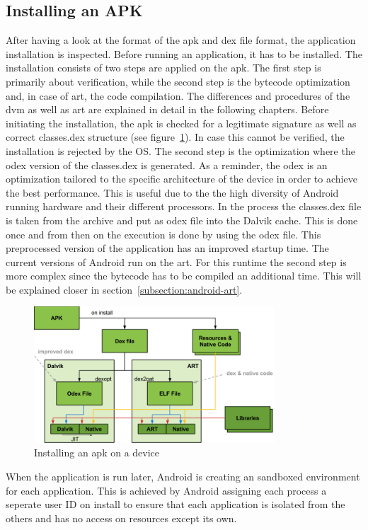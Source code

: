 \subsection{Installing an APK} \label{subsection:android-install}
After having a look at the format of the \gls{apk} and \gls{dex} file format, the application installation is inspected.
Before running an application, it has to be installed.
The installation consists of two steps are applied on the \gls{apk}.
The first step is primarily about verification, while the second step is the bytecode optimization and, in case of \gls{art}, the code compilation.
The differences and procedures of the \gls{dvm} as well as \gls{art} are explained in detail in the following chapters.
Before initiating the installation, the \gls{apk} is checked for a legitimate signature as well as correct classes.dex structure (see figure~\ref{fig:install}).
In case this cannot be verified, the installation is rejected by the OS.
The second step is the optimization where the \gls{odex} version of the classes.dex is generated.
As a reminder, the \gls{odex} is an optimization tailored to the specific architecture of the device in order to achieve the best performance.
This is useful due to the the high diversity of Android running hardware and their different processors.
In the process the classes.dex file is taken from the archive and put as \gls{odex} file into the Dalvik cache.
This is done once and from then on the execution is done by using the \gls{odex} file.
This preprocessed version of the application has an improved startup time. \cite{kovachevaMaster}
The current versions of Android run on the \gls{art}.
For this runtime the second step is more complex since the bytecode has to be compiled an additional time.
This will be explained closer in section~\ref{subsection:android-art}.
\newline
\begin{figure}[h]
    \centering
    \includegraphics[width=0.8\textwidth]{data/install.png}
    \caption{Installing an \gls{apk} on a device \cite{googleIOArt}}
    \label{fig:install}
\end{figure}

When the application is run later, Android is creating an sandboxed environment for each application.
This is achieved by Android assigning each process a seperate user ID on install to ensure that each application is isolated from the others and has no access on resources except its own. \cite{developerFundamentals}
